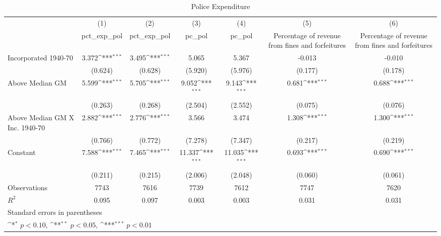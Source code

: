 \begin{table}[htbp]\centering
\def\sym#1{\ifmmode^{#1}\else\(^{#1}\)\fi}
\caption{Police Expenditure}
\begin{tabular}{l*{6}{c}}
\hline\hline
                    &\multicolumn{1}{c}{(1)}&\multicolumn{1}{c}{(2)}&\multicolumn{1}{c}{(3)}&\multicolumn{1}{c}{(4)}&\multicolumn{1}{c}{(5)}&\multicolumn{1}{c}{(6)}\\
                    &\multicolumn{1}{c}{pct\_exp\_pol}&\multicolumn{1}{c}{pct\_exp\_pol}&\multicolumn{1}{c}{pc\_pol}&\multicolumn{1}{c}{pc\_pol}&\multicolumn{1}{c}{Percentage of revenue from fines and forfeitures}&\multicolumn{1}{c}{Percentage of revenue from fines and forfeitures}\\
\hline
Incorporated 1940-70&       3.372\sym{***}&       3.495\sym{***}&       5.065         &       5.367         &      -0.013         &      -0.010         \\
                    &     (0.624)         &     (0.628)         &     (5.920)         &     (5.976)         &     (0.177)         &     (0.178)         \\
[1em]
Above Median GM     &       5.599\sym{***}&       5.705\sym{***}&       9.052\sym{***}&       9.143\sym{***}&       0.681\sym{***}&       0.688\sym{***}\\
                    &     (0.263)         &     (0.268)         &     (2.504)         &     (2.552)         &     (0.075)         &     (0.076)         \\
[1em]
Above Median GM X Inc. 1940-70&       2.882\sym{***}&       2.776\sym{***}&       3.566         &       3.474         &       1.308\sym{***}&       1.300\sym{***}\\
                    &     (0.766)         &     (0.772)         &     (7.278)         &     (7.347)         &     (0.217)         &     (0.219)         \\
[1em]
Constant            &       7.588\sym{***}&       7.465\sym{***}&      11.337\sym{***}&      11.035\sym{***}&       0.693\sym{***}&       0.690\sym{***}\\
                    &     (0.211)         &     (0.215)         &     (2.006)         &     (2.048)         &     (0.060)         &     (0.061)         \\
\hline
Observations        &        7743         &        7616         &        7739         &        7612         &        7747         &        7620         \\
\(R^{2}\)           &       0.095         &       0.097         &       0.003         &       0.003         &       0.031         &       0.031         \\
\hline\hline
\multicolumn{7}{l}{\footnotesize Standard errors in parentheses}\\
\multicolumn{7}{l}{\footnotesize \sym{*} \(p<0.10\), \sym{**} \(p<0.05\), \sym{***} \(p<0.01\)}\\
\end{tabular}
\end{table}
